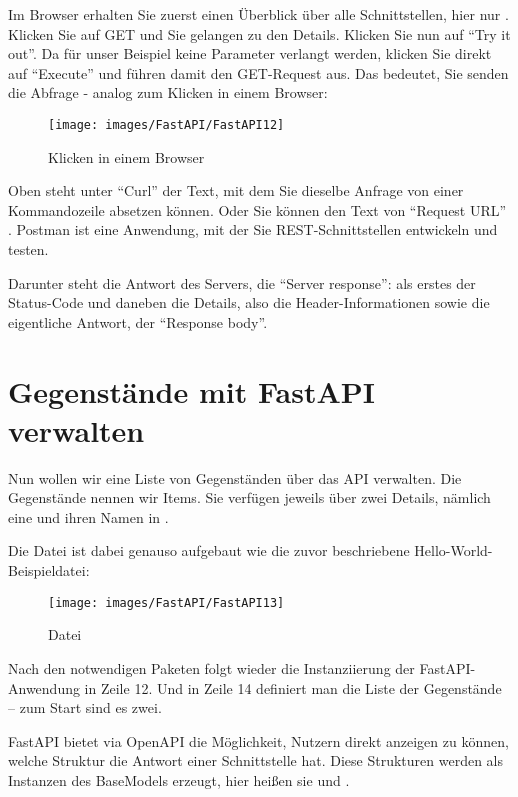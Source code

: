 Im Browser erhalten Sie zuerst einen Überblick über alle Schnittstellen, hier nur . Klicken Sie auf GET und Sie gelangen zu den Details. Klicken Sie nun auf ``Try it out''. Da für unser Beispiel keine Parameter verlangt werden, klicken Sie direkt auf ``Execute'' und führen damit den GET-Request aus. Das bedeutet, Sie senden die Abfrage - analog zum Klicken in einem Browser:

\begin{figure}
    \texttt{[image: images/FastAPI/FastAPI12]}
    \caption{Klicken in einem Browser} \label{FastAPI12}
\end{figure}

Oben steht unter ``Curl'' der Text, mit dem Sie dieselbe Anfrage von einer Kommandozeile absetzen können. Oder Sie können den Text von ``Request URL'' . Postman ist eine Anwendung, mit der Sie REST-Schnittstellen entwickeln und testen.

Darunter steht die Antwort des Servers, die ``Server response'': als erstes der Status-Code und daneben die Details, also die Header-Informationen sowie die eigentliche Antwort, der ``Response body''.

\section{Gegenstände mit FastAPI verwalten}

Nun wollen wir eine Liste von Gegenständen über das API verwalten. Die Gegenstände nennen wir Items. Sie verfügen jeweils über zwei Details, nämlich eine  und ihren Namen in .

Die Datei  ist dabei genauso aufgebaut wie die zuvor beschriebene Hello-World-Beispieldatei:

\begin{figure}
    \texttt{[image: images/FastAPI/FastAPI13]}
    \caption{Datei } \label{FastAPI13}
\end{figure}


Nach den notwendigen Paketen folgt wieder die Instanziierung der FastAPI-Anwendung in Zeile 12. Und in Zeile 14 definiert man die Liste der Gegenstände -- zum Start sind es zwei.

FastAPI bietet via OpenAPI die Möglichkeit, Nutzern direkt anzeigen zu können, welche Struktur die Antwort einer Schnittstelle hat. Diese Strukturen werden als Instanzen des BaseModels erzeugt, hier heißen sie  und .

